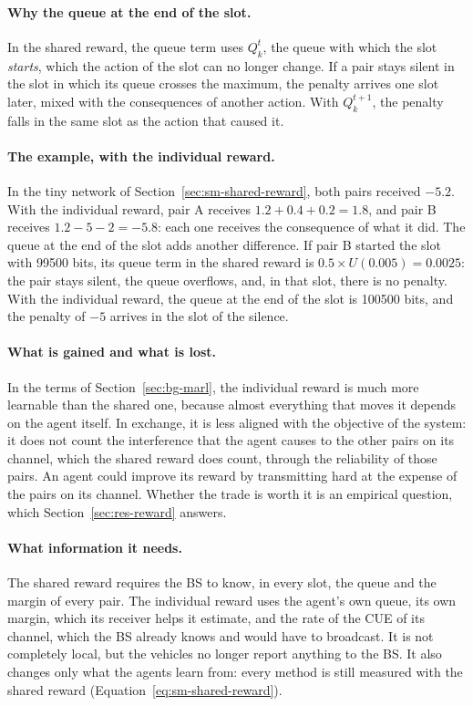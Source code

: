 \paragraph{Why the queue at the end of the slot.} In the shared reward, the queue term uses $Q_k^t$, the queue
with which the slot \emph{starts}, which the action of the slot can no longer change. If a pair stays silent
in the slot in which its queue crosses the maximum, the penalty arrives one slot later, mixed with the
consequences of another action. With $Q_k^{t+1}$, the penalty falls in the same slot as the action that
caused it.

\paragraph{The example, with the individual reward.} In the tiny network of
Section~\ref{sec:sm-shared-reward}, both pairs received $-5.2$. With the individual reward, pair A receives
$1.2 + 0.4 + 0.2 = 1.8$, and pair B receives $1.2 - 5 - 2 = -5.8$: each one receives the consequence of what it
did. The queue at the end of the slot adds another difference. If pair B started the slot with \num{99500}
bits, its queue term in the shared reward is $0.5 \times U(0.005) = 0.0025$: the pair stays silent, the queue
overflows, and, in that slot, there is no penalty. With the individual reward, the queue at the end of the
slot is \num{100500} bits, and the penalty of $-5$ arrives in the slot of the silence.

\paragraph{What is gained and what is lost.} In the terms of Section~\ref{sec:bg-marl}, the individual reward
is much more learnable than the shared one, because almost everything that moves it depends on the agent
itself. In exchange, it is less aligned with the objective of the system: it does not count the interference
that the agent causes to the other pairs on its channel, which the shared reward does count, through the
reliability of those pairs. An agent could improve its reward by transmitting hard at the expense of the
pairs on its channel. Whether the trade is worth it is an empirical question, which
Section~\ref{sec:res-reward} answers.

\paragraph{What information it needs.} The shared reward requires the \ac{BS} to know, in every slot, the queue
and the margin of every pair. The individual reward uses the agent's own queue, its own margin, which its
receiver helps it estimate, and the rate of the \ac{CUE} of its channel, which the \ac{BS} already knows and
would have to broadcast. It is not completely local, but the vehicles no longer report anything to the
\ac{BS}. It also changes only what the agents learn from: every method is still measured with the shared
reward (Equation~\ref{eq:sm-shared-reward}).

